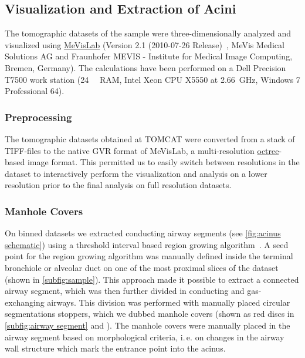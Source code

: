 \documentclass[%
	draft=true,
	paper=a4,%
	twoside=true,%
	abstract=true]{scrartcl}
\newcommand{\ie}{i.\,e.\xspace}
\begin{document}
\subsection{Visualization and Extraction of Acini}
The tomographic datasets of the sample were three-dimensionally analyzed and visualized using \href{http://mevislab.de}{MeVisLab} (Version 2.1 (2010-07-26 Release)~\cite{Bitter2007}, MeVis Medical Solutions AG and Fraunhofer MEVIS - Institute for Medical Image Computing, Bremen, Germany). The calculations have been performed on a Dell Precision T7500 work station (\SI{24}{\giga\byte} RAM, Intel Xeon CPU X5550 at \SI{2.66}{\giga\hertz}, Windows 7 Professional \SI{64}{\bit}).

\subsubsection{Preprocessing}
The tomographic datasets obtained at TOMCAT were converted from a stack of TIFF-files to the native GVR format of MeVisLab, a multi-resolution \href{https://secure.wikimedia.org/wikipedia/en/w/index.php?title=Octree&oldid=409131920}{octree}-based image format. This permitted us to easily switch between resolutions in the dataset to interactively perform the visualization and analysis on a lower resolution prior to the final analysis on full resolution datasets.

\subsubsection{Manhole Covers}\label{sec:manhole covers}
On binned datasets we extracted conducting airway segments (see \autoref{fig:acinus schematic}) using a threshold interval based region growing algorithm~\cite{Zucker1976}. A seed point for the region growing algorithm was manually defined inside the terminal bronchiole or alveolar duct on one of the most proximal slices of the dataset (shown in \autoref{subfig:sample}). This approach made it possible to extract a connected airway segment, which was then further divided in conducting and gas-exchanging airways. This division was performed with manually placed circular segmentations stoppers, which we dubbed manhole covers (shown as red discs in \autoref{subfig:airway segment} and ). The manhole covers were manually placed in the airway segment based on morphological criteria, \ie on changes in the airway wall structure which mark the entrance point into the acinus.
\end{document}

